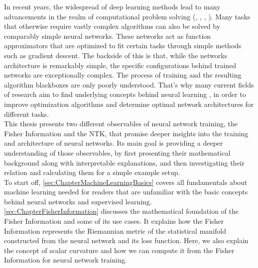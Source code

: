 In recent years, the widespread of deep learning methods lead to many advancements in the realm of computational problem solving (\cite{DeepLearning:DNA}, \cite{DeepLearning:DrugRecognition}, \cite{DeepLearning:ImageNetClassification}, \cite{DeepLearning:Translation}). Many tasks that otherwise require vastly complex algorithms can also be solved by comparably simple neural networks. These networks act as function approximators that are optimized to fit certain tasks through simple methods such as gradient descent. The backside of this is that, while the networks architecture is remarkably simple, the specific configurations behind trained networks are exceptionally complex. The process of training and the resulting algorithm blackboxes are only poorly understood. That's why many current fields of research aim to find underlying concepts behind neural learning \cite{InterpretableAI}, in order to improve optimization algorithms and determine optimal network architectures for different tasks.\\
This thesis presents two different observables of neural network training, the Fisher Information and the NTK, that promise deeper insights into the training and architecture of neural networks. Its main goal is providing a deeper understanding of those observables, by first presenting their mathematical background along with interpretable explanations, and then investigating their relation and calculating them for a simple example setup.\\
To start off, \cref{sec:ChapterMachineLearningBasics} covers all fundamentals about machine learning needed for readers that are unfamiliar with the basic concepts behind neural networks and supervised learning.\\
\cref{sec:ChapterFisherInformation} discusses the mathematical foundation of the Fisher Information and some of its use cases. It explains how the Fisher Information represents the Riemannian metric of the statistical manifold constructed from the neural network and its loss function. Here, we also explain the concept of scalar curvature and how we can compute it from the Fisher Information for neural network training. %

